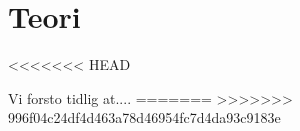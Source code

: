 \chapter{Teori}
\label{chp:teori}
<<<<<<< HEAD

Vi forsto tidlig at....
=======
>>>>>>> 996f04c24df4d463a78d46954fc7d4da93c9183e
